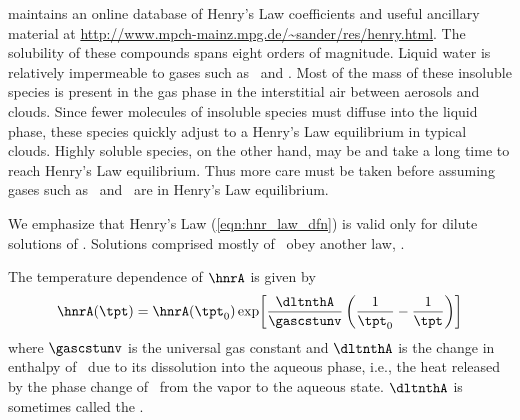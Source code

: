 \documentclass[12pt,twoside]{book}
\begin{document}
\cite{San992} maintains an online database of Henry's Law coefficients 
and useful ancillary material at
\url{http://www.mpch-mainz.mpg.de/~sander/res/henry.html}.
The solubility of these compounds spans eight orders of magnitude.
Liquid water is relatively impermeable to gases such as \NO\ and \Ot. 
Most of the mass of these insoluble species is present in the gas
phase in the interstitial air between aerosols and clouds.  
Since fewer molecules of insoluble species must diffuse into the
liquid phase, these species quickly adjust to a Henry's Law
equilibrium in typical clouds.
Highly soluble species, on the other hand, may be  and take a long time to reach Henry's Law equilibrium.
Thus more care must be taken before assuming gases such as \HNOt\ and
\HdOd\ are in Henry's Law equilibrium.

We emphasize that Henry's Law (\ref{eqn:hnr_law_dfn}) is valid only
for dilute solutions of \A.   
Solutions comprised mostly of \A\ obey another law,  \cite[e.g.,][]{Atk90,SeP97}. 

The temperature dependence of $\hnrA$ is given by 
\begin{equation}
\hnrA(\tpt) = \hnrA( \tpt_{0} ) \exp\! 
\left[ \frac{\dltnthA}{\gascstunv} 
\left( \frac{1}{\tpt_{0}} - \frac{1}{\tpt} \right)
\right]
\label{eqn:hnr_tpt_dfn}
\end{equation}
where $\gascstunv$ is the universal gas constant and $\dltnthA$ is the
change in enthalpy of \A\ due to its dissolution into the aqueous
phase, i.e., the heat released by the phase change of \A\ from the
vapor to the aqueous state.  
$\dltnthA$ is sometimes called the .
\end{document}
